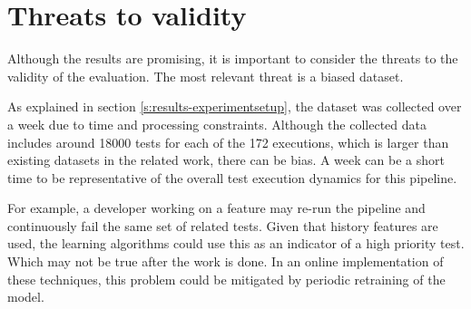 \section{Threats to validity}\label{s:conclusion-threats}

Although the results are promising, it is important to consider
the threats to the validity of the evaluation. The most relevant threat 
is a biased dataset.

As explained in section \ref{s:results-experimentsetup}, the dataset was 
collected over a week due to time and processing constraints.
Although the collected data includes around 18000 tests for each of the 172
executions, which is larger than existing datasets in the related work, there
can be bias. A week can be a short time to be representative of the
overall test execution dynamics for this pipeline.

For example, a developer working on a feature may re-run the pipeline and continuously
fail the same set of related tests. Given that history features are used, the learning algorithms
could use this as an indicator of a high priority test. Which may not be true after the 
work is done. In an online implementation of these techniques, this problem
could be mitigated by periodic retraining of the model.
